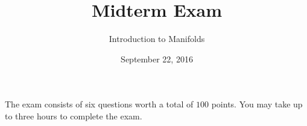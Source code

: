 \documentclass{amsart}
\newcommand{\+}[1]{\ensuremath{\mathbf{#1}}}
\newcommand{\R}{{\mathbb R}}
\theoremstyle{definition}
\newtheorem{prob}{Problem}
\begin{document}
\title{Midterm Exam}
\date{September 22, 2016}
\author{Introduction to Manifolds}

\maketitle


The exam consists of six questions  worth a total of $100$ points.
You may take up to three hours to complete the exam.

\vspace{3mm}

\begin{comment}
\begin{prob}[$15$ pts]
Let $I$ be the $3 \times 3$ identity matrix, and let $A = \begin{bmatrix}
3 & 2 & 6 \\ 2 & 2 & 5 \\ -2 & -1 & -4 
\end{bmatrix}$.
Let $\Gamma_I, \Gamma_A \subset \R^6$ denote the graphs of the corresponding linear transformations from
$\R^3$ to $\R^3$.
Do $\Gamma_I$ and $\Gamma_A$ have transverse intersection?
Justify your answer using the definition of transverse intersection: namely that
\[\Gamma_I \pitchfork \Gamma_A \Longleftrightarrow T_p\Gamma_I + T_p\Gamma_A = T_p\R^6 \text{ for all } p \in \Gamma_I \cap \Gamma_A.\]
\end{prob}

\vspace{3mm}
\end{comment}

\begin{comment}
\begin{prob}[$15$ pts]
Let $M$ be a \emph{compact} smooth manifold.  Show that there is no smooth submersion $F: M \to \R^k$ for any $k >0$.
\end{prob}

\vspace{3mm}
\end{comment}





\end{document}
